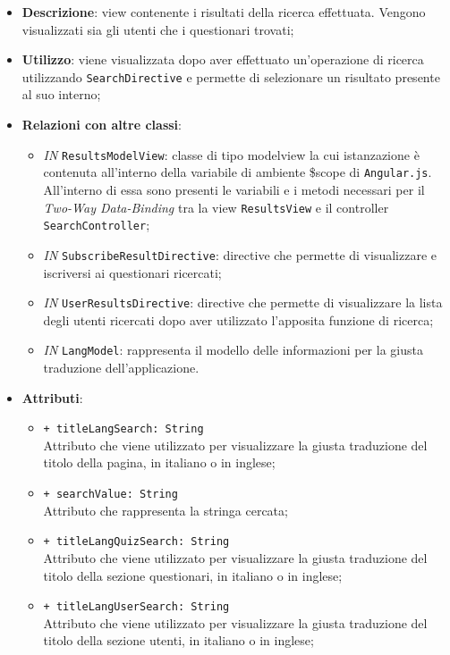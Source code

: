 \begin{itemize}
	\item \textbf{Descrizione}: view contenente i risultati della ricerca effettuata. Vengono visualizzati sia gli utenti che i questionari trovati;
	\item \textbf{Utilizzo}: viene visualizzata dopo aver effettuato un'operazione di ricerca utilizzando \texttt{SearchDirective} e permette di selezionare un risultato presente al suo interno; 
	\item \textbf{Relazioni con altre classi}:
	\begin{itemize}
		\item \textit{IN} \texttt{ResultsModelView}: classe di tipo modelview la cui istanzazione è contenuta all'interno della variabile di ambiente \$scope di \texttt{Angular.js}. All'interno di essa sono presenti le variabili e i metodi necessari per il \textit{Two-Way Data-Binding} tra la view \texttt{ResultsView} e il controller \texttt{SearchController};
		\item \textit{IN} \texttt{SubscribeResultDirective}: directive che permette di visualizzare e iscriversi ai questionari ricercati;
		\item \textit{IN} \texttt{UserResultsDirective}: directive che permette di visualizzare la lista degli utenti ricercati dopo aver utilizzato l'apposita funzione di ricerca;
		\item \textit{IN} \texttt{LangModel}: rappresenta il modello delle informazioni per la giusta traduzione dell'applicazione.
	\end{itemize}
	\item \textbf{Attributi}:
		\begin{itemize}
			\item \texttt{+ titleLangSearch: String} \\ Attributo che viene utilizzato per visualizzare la giusta traduzione del titolo della pagina, in italiano o in inglese;
			\item \texttt{+ searchValue: String} \\ Attributo che rappresenta la stringa cercata;
			\item \texttt{+ titleLangQuizSearch: String} \\ Attributo che viene utilizzato per visualizzare la giusta traduzione del titolo della sezione questionari, in italiano o in inglese;
			\item \texttt{+ titleLangUserSearch: String} \\ Attributo che viene utilizzato per visualizzare la giusta traduzione del titolo della sezione utenti, in italiano o in inglese;
		\end{itemize}
\end{itemize}